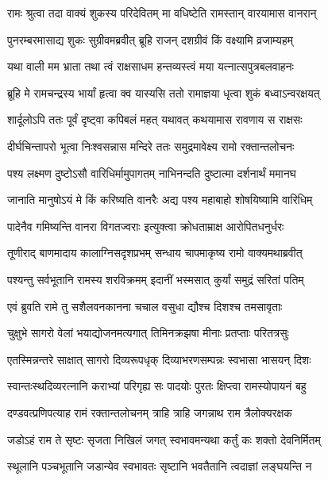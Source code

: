 \twolineshloka
{रामः श्रुत्वा तदा वाक्यं शुकस्य परिदेवितम्}
{मा वधिष्टेति रामस्तान् वारयामास वानरान्} %

\twolineshloka
{पुनरम्बरमासाद्य शुकः सुग्रीवमब्रवीत्}
{ब्रूहि राजन् दशग्रीवं किं वक्ष्यामि व्रजाम्यहम्} %


\twolineshloka
{यथा वाली मम भ्राता तथा त्वं राक्षसाधम}
{हन्तव्यस्त्वं मया यत्नात्सपुत्रबलवाहनः} %

\twolineshloka
{ब्रूहि मे रामचन्द्रस्य भार्यां हृत्वा क्व यास्यसि}
{ततो रामाज्ञया धृत्वा शुकं बध्वाऽन्वरक्षयत्} %

\twolineshloka
{शार्दूलोऽपि ततः पूर्वं दृष्ट्वा कपिबलं महत्}
{यथावत् कथयामास रावणाय स राक्षसः} %

\twolineshloka
{दीर्घचिन्तापरो भूत्वा निःश्वसन्नास मन्दिरे}
{ततः समुद्रमावेक्ष्य रामो रक्तान्तलोचनः} %

\twolineshloka
{पश्य लक्ष्मण दुष्टोऽसौ वारिधिर्मामुपागतम्}
{नाभिनन्दति दुष्टात्मा दर्शनार्थं ममानघ} %

\twolineshloka
{जानाति मानुषोऽयं मे किं करिष्यति वानरैः}
{अद्य पश्य महाबाहो शोषयिष्यामि वारिधिम्} %

\twolineshloka
{पादेनैव गमिष्यन्ति वानरा विगतज्वराः}
{इत्युक्त्वा क्रोधताम्राक्ष आरोपितधनुर्धरः} %

\twolineshloka
{तूणीराद् बाणमादाय कालाग्निसदृशप्रभम्}
{सन्धाय चापमाकृष्य रामो वाक्यमथाब्रवीत्} %

\twolineshloka
{पश्यन्तु सर्वभूतानि रामस्य शरविक्रमम्}
{इदानीं भस्मसात् कुर्यां समुद्रं सरितां पतिम्} %

\twolineshloka
{एवं ब्रुवति रामे तु सशैलवनकानना}
{चचाल वसुधा द्यौश्च दिशश्च तमसावृताः} %

\twolineshloka
{चुक्षुभे सागरो वेलां भयाद्योजनमत्यगात्}
{तिमिनक्रझषा मीनाः प्रतप्ताः परितत्रसुः} %

\twolineshloka
{एतस्मिन्नन्तरे साक्षात् सागरो दिव्यरूपधृक्}
{दिव्याभरणसम्पन्नः स्वभासा भासयन् दिशः} %

\twolineshloka
{स्वान्तःस्थदिव्यरत्नानि कराभ्यां परिगृह्य सः}
{पादयोः पुरतः क्षिप्त्वा रामस्योपायनं बहु} %

\twolineshloka
{दण्डवत्प्रणिपत्याह रामं रक्तान्तलोचनम्}
{त्राहि त्राहि जगन्नाथ राम त्रैलोक्यरक्षक} %

\twolineshloka
{जडोऽहं राम ते सृष्टः सृजता निखिलं जगत्}
{स्वभावमन्यथा कर्तुं कः शक्तो देवनिर्मितम्} %

\twolineshloka
{स्थूलानि पञ्चभूतानि जडान्येव स्वभावतः}
{सृष्टानि भवतैतानि त्वदाज्ञां लङ्घयन्ति न} %

